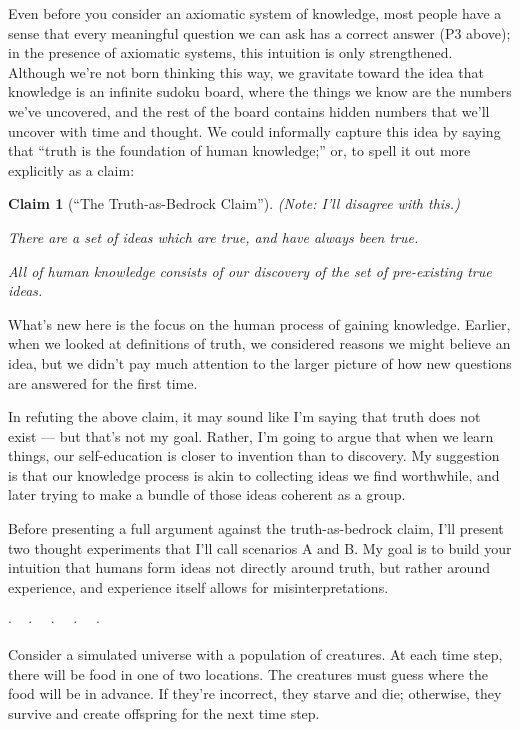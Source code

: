 \documentclass[9pt, twoside]{book}
\newtheorem*{claim}{Claim}
\theoremstyle{argtstyle}
\newcommand{\dotq}{\cdot\quad}
\newcommand{\scenebreak}{
    \medskip\centerline{$\dotq\dotq\dotq\dotq\cdot$}\medskip
}
\begin{document}
Even before you consider an axiomatic system of knowledge, most people have a
sense that every meaningful question we can ask has a correct answer (P3
above); in the presence of axiomatic systems, this intuition is only
strengthened.
Although we're not born thinking this way,
we gravitate toward
the idea that knowledge is an infinite sudoku board, where
the things we know are the numbers we've uncovered, and the rest of the board
contains hidden numbers that we'll uncover with time and thought.
We could informally capture this idea by saying that ``truth is the foundation
of
human knowledge;'' or, to spell it out more explicitly as a claim:
\begin{claim}[``The Truth-as-Bedrock Claim'']
    {\normalfont (Note: I'll disagree with this.)}
    
    There are a set of ideas which are true, and have
    always been true.

    All of human knowledge consists of our discovery
    of the set of pre-existing true ideas.
\end{claim}

What's new here is the focus on the human process
of gaining knowledge. Earlier, when we looked at definitions
of truth, we considered reasons we might believe an idea, but
we didn't pay much attention to the larger picture of how new
questions are answered for the first time.

In refuting the above claim, it may sound like I'm saying
that truth does not exist --- but that's not my goal.
Rather, I'm going to argue that when we learn things, our
self-education is closer to invention than to discovery.
My suggestion is that our knowledge process is akin to
collecting ideas we find worthwhile, and later trying
to make a bundle of those ideas coherent as a group.

Before presenting a full argument against the truth-as-bedrock claim,
I'll present two
thought experiments that I'll call scenarios A and B.
My goal is to build your intuition that humans form ideas not directly around
truth, but rather around experience, and experience itself allows for
misinterpretations.

\scenebreak

\noindent [{\bf Scenario A.}]\quad
        Consider a simulated universe with a
        population of creatures. At each time step, there will be food in
        one of two locations.
        The creatures must guess where the food will
        be in advance. If they're incorrect, they starve and die; otherwise,
        they survive and create offspring for the next time step.
\end{document}

